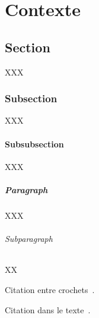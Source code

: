 \chapter*{Contexte}
\label{chap:contexte}

\section{Section}

XXX

\subsection{Subsection}

XXX

\subsubsection{Subsubsection}

XXX

\paragraph{Paragraph}

XXX

\subparagraph{Subparagraph}

XX

Citation entre crochets~\citep{ref1,ref2}.

Citation dans le texte~\citet{ref3}.

